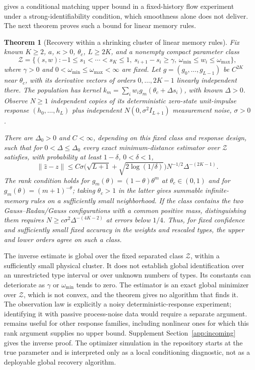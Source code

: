 \documentclass[12pt]{article}
\newtheorem{theorem}{Theorem}[section]
\theoremstyle{definition}
\theoremstyle{remark}
\begin{document}
\citet[Proposition~S29.1]{niroula2026full} gives a conditional matching upper bound in a fixed-history flow experiment under a strong-identifiability condition, which smoothness alone does not deliver. The next theorem proves such a bound for linear memory rules.

\begin{theorem}[Recovery within a shrinking cluster of linear memory rules]\label{n:shape}
Fix known $K\ge2$, $a$, $\kappa>0$, $\theta_c$, $L\ge2K$, and a nonempty compact parameter class
\[
\mathcal Z=\{(s,w):-1\le s_1<\cdots<s_K\le1,\ s_{i+1}-s_i\ge\gamma,
\ \omega_{\min}\le w_i\le\omega_{\max}\},
\]
where $\gamma>0$ and $0<\omega_{\min}\le\omega_{\max}<\infty$ are fixed. Let $g=(g_0,\ldots,g_{L-1})$ be $C^{2K}$ near $\theta_c$, with its derivative vectors of orders $0,\ldots,2K-1$ linearly independent there. The population has kernel $k_m=\sum_iw_i g_m(\theta_c+\Delta s_i)$, with known $\Delta>0$. Observe $N\ge1$ independent copies of its deterministic zero-state unit-impulse response $(h_0,\ldots,h_L)$ plus independent $N(0,\sigma^2 I_{L+1})$ measurement noise, $\sigma>0$.

There are $\Delta_0>0$ and $C<\infty$, depending on this fixed class and response design, such that for $0<\Delta\le\Delta_0$ every exact minimum-distance estimator over $\mathcal Z$ satisfies, with probability at least $1-\delta$, $0<\delta<1$,
\[
\|\hat z-z\|\le C\sigma\big(\sqrt{L+1}+\sqrt{2\log(1/\delta)}\big)
N^{-1/2}\Delta^{-(2K-1)}.
\]
The rank condition holds for $g_m(\theta)=(1-\theta)\theta^m$ at $\theta_c\in(0,1)$ and for $g_m(\theta)=(m+1)^{-\theta}$; taking $\theta_c>1$ in the latter gives summable infinite-memory rules on a sufficiently small neighborhood.
If the class contains the two Gauss--Radau/Gauss configurations with a common positive mass, distinguishing them requires $N\ge c\sigma^2\Delta^{-(4K-2)}$ at errors below $1/4$. Thus, for fixed confidence and sufficiently small fixed accuracy in the weights and rescaled types, the upper and lower orders agree on such a class.
\end{theorem}

The inverse estimate is global over the fixed separated class $\mathcal Z$, within a sufficiently small physical cluster. It does not establish global identification over an unrestricted type interval or over unknown numbers of types. Its constants can deteriorate as $\gamma$ or $\omega_{\min}$ tends to zero. The estimator is an exact global minimizer over $\mathcal Z$, which is not convex, and the theorem gives no algorithm that finds it. The observation law is explicitly a noisy deterministic-response experiment; identifying it with passive process-noise data would require a separate argument. \citet[Proposition~S29.1]{niroula2026full} remains useful for other response families, including nonlinear ones for which this rank argument supplies no upper bound. Supplement Section~\ref{app:incoming} gives the inverse proof. The optimizer simulation in the repository starts at the true parameter and is interpreted only as a local conditioning diagnostic, not as a deployable global recovery algorithm.
\end{document}
